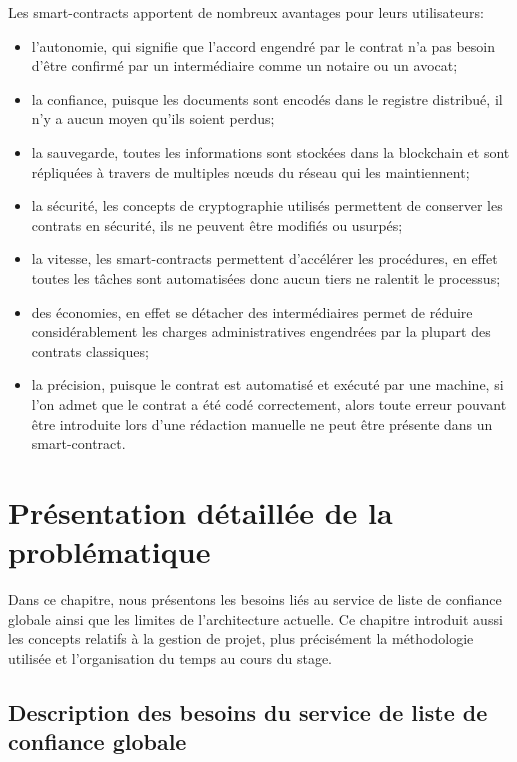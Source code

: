 \documentclass{tnreport}
\begin{document}
\clearpage
Les smart-contracts apportent de nombreux avantages pour leurs utilisateurs:
\begin{itemize}
	\item l'autonomie, qui signifie que l'accord engendré par le contrat n'a pas besoin d'être confirmé par un intermédiaire comme un notaire ou un avocat;
	\item la confiance, puisque les documents sont encodés dans le registre distribué, il n'y a aucun moyen qu'ils soient perdus;
	\item la sauvegarde, toutes les informations sont stockées dans la blockchain et sont répliquées à travers de multiples nœuds du réseau qui les maintiennent;
	\item la sécurité, les concepts de cryptographie utilisés permettent de conserver les contrats en sécurité, ils ne peuvent être modifiés ou usurpés;
	\item la vitesse, les smart-contracts permettent d'accélérer les procédures, en effet toutes les tâches sont automatisées donc aucun tiers ne ralentit le processus;
	\item des économies, en effet se détacher des intermédiaires permet de réduire considérablement les charges administratives engendrées par la plupart des contrats classiques;
	\item la précision, puisque le contrat est automatisé et exécuté par une machine, si l'on admet que le contrat a été codé correctement, alors toute erreur pouvant être introduite lors d'une rédaction manuelle ne peut être présente dans un smart-contract.
\end{itemize}

\chapter{Présentation détaillée de la problématique}
\label{chap:prob}

Dans ce chapitre, nous présentons les besoins liés au service de liste de confiance globale ainsi que les limites de l'architecture actuelle. Ce chapitre introduit aussi les concepts relatifs à la gestion de projet, plus précisément la méthodologie utilisée et l'organisation du temps au cours du stage.

\section{Description des besoins du service de liste de confiance globale}
\label{sec:description}
\end{document}
